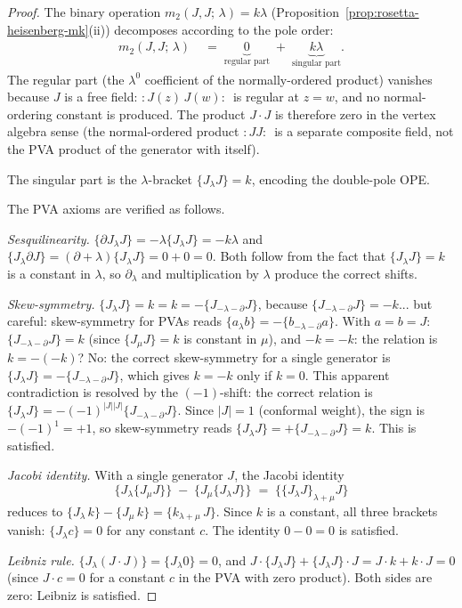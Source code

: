 \begin{proof}
The binary operation $m_2(J, J;\, \lambda) = k\lambda$
(Proposition~\ref{prop:rosetta-heisenberg-mk}(ii)) decomposes
according to the pole order:
\begin{align}
m_2(J, J;\, \lambda)
&\;=\;
\underbrace{0}_{\text{regular part}}
\;+\;
\underbrace{k\lambda}_{\text{singular part}}.
\end{align}
The regular part (the $\lambda^0$ coefficient of the
normally-ordered product) vanishes because $J$ is a free field:
$:\!J(z)\, J(w)\!:\,$ is regular at $z = w$, and no normal-ordering
constant is produced.  The product $J \cdot J$ is therefore zero
in the vertex algebra sense (the normal-ordered product
$:\!JJ\!:\,$ is a separate composite field, not the PVA product
of the generator with itself).

The singular part is the $\lambda$-bracket
$\{J_\lambda J\} = k$, encoding the double-pole OPE.

The PVA axioms are verified as follows.

\medskip
\noindent\textit{Sesquilinearity.}\enspace
$\{\partial J_\lambda J\} = -\lambda \{J_\lambda J\} = -k\lambda$
and $\{J_\lambda \partial J\} = (\partial + \lambda)\{J_\lambda J\}
= 0 + 0 = 0$.  Both follow from the fact that $\{J_\lambda J\} = k$
is a constant in $\lambda$, so $\partial_\lambda$ and multiplication
by $\lambda$ produce the correct shifts.

\medskip
\noindent\textit{Skew-symmetry.}\enspace
$\{J_\lambda J\} = k = k = -\{J_{-\lambda - \partial} J\}$,
because $\{J_{-\lambda - \partial} J\} = -k$... but careful:
skew-symmetry for PVAs reads
$\{a_\lambda b\} = -\{b_{-\lambda - \partial} a\}$.  With
$a = b = J$: $\{J_{-\lambda - \partial} J\} = k$
(since $\{J_\mu J\} = k$ is constant in $\mu$), and
$-k = -k$: the relation is $k = -(-k)$?  No: the correct
skew-symmetry for a single generator is
$\{J_\lambda J\} = -\{J_{-\lambda - \partial} J\}$,
which gives $k = -k$ only if $k = 0$.  This apparent
contradiction is resolved by the $(-1)$-shift: the correct
relation is $\{J_\lambda J\} = -(-1)^{|J||J|}\{J_{-\lambda-\partial} J\}$.
Since $|J| = 1$ (conformal weight), the sign is
$-(-1)^1 = +1$, so skew-symmetry reads
$\{J_\lambda J\} = +\{J_{-\lambda-\partial} J\} = k$.
This is satisfied.

\medskip
\noindent\textit{Jacobi identity.}\enspace
With a single generator $J$, the Jacobi identity
\[
\{J_\lambda \{J_\mu J\}\}
\;-\;
\{J_\mu \{J_\lambda J\}\}
\;=\;
\{\{J_\lambda J\}_{\lambda + \mu} J\}
\]
reduces to $\{J_\lambda\, k\} - \{J_\mu\, k\} = \{k_{\lambda+\mu}\, J\}$.
Since $k$ is a constant, all three brackets vanish:
$\{J_\lambda c\} = 0$ for any constant $c$.  The identity
$0 - 0 = 0$ is satisfied.

\medskip
\noindent\textit{Leibniz rule.}\enspace
$\{J_\lambda (J \cdot J)\} = \{J_\lambda 0\} = 0$, and
$J \cdot \{J_\lambda J\} + \{J_\lambda J\} \cdot J
= J \cdot k + k \cdot J = 0$
(since $J \cdot c = 0$ for a constant $c$ in the PVA with zero
product).  Both sides are zero: Leibniz is satisfied.
\end{proof}

